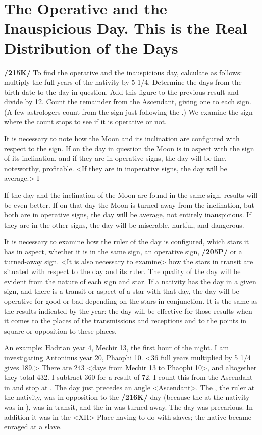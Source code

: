 \section{The Operative and the Inauspicious Day. This is the Real Distribution of the Days}

\textbf{/215K/} To find the operative and the inauspicious day, calculate as follows: multiply the full years of the nativity by 5 1/4. Determine the days from the birth date to the day in question. Add this figure to the previous result and divide by 12. Count the remainder from the Ascendant, giving one to each sign. (A few astrologers count from the sign just following the \Moon.) We examine the sign where the count stops to see if it is operative or not. 

It \mndl  is necessary to note how the Moon and its inclination are configured with respect to the sign. If on the day in question the Moon is in aspect with the sign of its inclination, and if they are in operative signs, the day will be fine, noteworthy, profitable. <If they are in inoperative signs, the day will be average.> I

If the day and the inclination of the Moon are found in the same sign, results will be even better. If on that day the Moon is turned away from the inclination, but both are in operative signs, the day will be average, not entirely inauspicious. If they are in the other signs, the day will be miserable, hurtful, and dangerous.

It \mndl is necessary to examine how the ruler of the day is configured, which stars it has in aspect, whether it is in the same sign, an operative sign, \textbf{/205P/} or a turned-away sign. <It is also necessary to examine> how the stars in transit are situated with respect to the day and its ruler. The quality of the day will be evident from the nature of each sign and star. If a nativity has the day in a given sign, and there is a transit or aspect of a star with that day, the day will be operative for good or bad depending on the stars in conjunction. It is the same as the results indicated by the year: the day will be effective for those results when it comes to the places of the transmissions and receptions and to the points in square or opposition to these places.

An example: Hadrian year 4, Mechir 13, the first hour of the night. I am investigating Antoninus year 20, Phaophi 10. <36 full years multiplied by 5 1/4 gives 189.> There are 243 <days from Mechir 13 to
Phaophi 10>, and altogether they total 432. I subtract 360 for a result of 72. I count this from the Ascendant in \Virgo\xspace and stop at \Leo. The day just precedes an angle <Ascendant>. The \Sun, the ruler at the nativity, was in opposition to the \textbf{/216K/} day (because the \Sun\xspace at the nativity was in \Aquarius), \Mars\xspace was in transit, and the \Moon\xspace in \Capricorn\xspace was turned away. The day was precarious. In addition it was in the <XII> Place having to do with slaves; the native became enraged at a slave.

